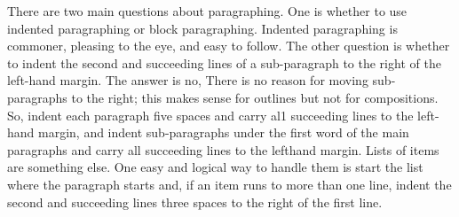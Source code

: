 \documentclass[
    oneside,
    11pt,
    draft
]{memoir}
\begin{document}
There are two main questions about paragraphing. One is whether to use indented paragraphing or block paragraphing. Indented paragraphing is commoner, pleasing to the eye, and easy to follow. The other question is whether to indent the second and succeeding lines of a sub-paragraph to the right of the left-hand margin. The answer is no, There is no reason for moving sub-paragraphs to the right; this makes sense for outlines but not for compositions. So, indent each paragraph five spaces and carry al1 succeeding lines to the left-hand margin, and indent sub-paragraphs under the first word of the main paragraphs and carry all succeeding lines to the lefthand margin. Lists of items are something else. One easy and logical way to handle them is start the list where the paragraph starts and, if an item runs to more than one line, indent the second and succeeding lines three spaces to the right of the first line.
\end{document}
